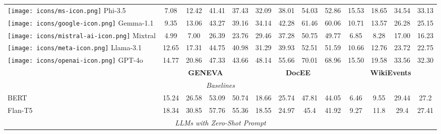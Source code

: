 \begin{table*}[h!]
\begin{tabular}{l|cccc|cccc|cccc}
\texttt{[image: icons/ms-icon.png]} Phi-3.5  & 7.08 & 12.42 & 41.41 & 37.43 & 32.09 & 38.01 & 54.03 & 52.86 & \cellcolor{green!15} 15.53 & 18.65 & \cellcolor{green!15} 34.54 & \cellcolor{green!15} 33.13 \\
\texttt{[image: icons/google-icon.png]} Gemma-1.1 & 9.35 & 13.06 & 43.27 & 39.16 & 34.14 & 42.28 & 61.46 & 60.06 & 10.71 & 13.57 & 26.28 & 25.15\\
\texttt{[image: icons/mistral-ai-icon.png]} Mixtral & 4.99 & 7.00 & 26.39 & 23.76 & 29.46 & 37.28 & 50.75 & 49.77 & 6.85 & 8.28 & 17.00 & 16.23 \\
\texttt{[image: icons/meta-icon.png]} Llama-3.1  & 12.65 & 17.31 & 44.75 & 40.98 & 31.29 & 39.93 & 52.51 & 51.59 & 10.66 & 12.76 & 23.72 & 22.75\\
\texttt{[image: icons/openai-icon.png]} GPT-4o  & \cellcolor{green!15} 14.77 & \cellcolor{green!15} 20.86 & 47.33 & 43.66 & \cellcolor{green!15} 48.14 & \cellcolor{green!15} 55.66 & 70.01 & 68.96 & 15.50 & \cellcolor{green!15} 19.58 & 33.56 & 32.30 \\

\midrule
\midrule

& \multicolumn{4}{c}{\textbf{GENEVA}} & \multicolumn{4}{c}{\textbf{DocEE}} & \multicolumn{4}{c}{\textbf{WikiEvents}} \\
\midrule
\multicolumn{13}{c}{\textit{Baselines }}\\
\midrule
BERT & 15.24 & 26.58 & 53.09 & 50.74 & 18.66 & 25.74 & 47.81 & 44.05& 6.46 & 9.55 & 29.44 & 27.2 \\
Flan-T5 & \cellcolor{green!15} 18.34 & \cellcolor{green!15} 30.85 & \cellcolor{green!15} 57.76 & \cellcolor{green!15} 55.36 & 18.55 & 24.97 & 45.4 & 41.92 & 9.27 & 11.8 & 29.4 & 27.41 \\

\midrule
\multicolumn{13}{c}{\textit{LLMs with Zero-Shot Prompt}}\\
\midrule


\end{tabular}
\end{table*}
